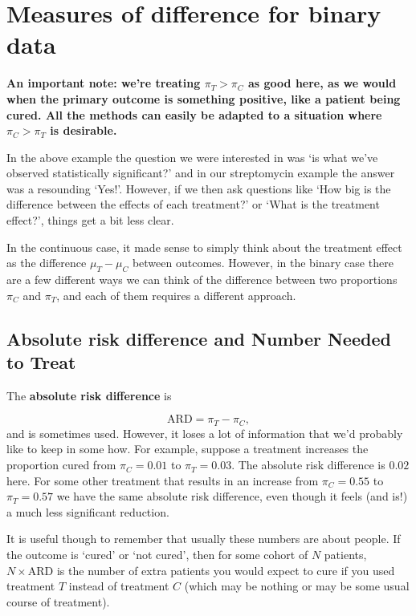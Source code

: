 \documentclass[
  openany]{book}
\theoremstyle{definition}
\theoremstyle{definition}
\theoremstyle{definition}
\theoremstyle{definition}
\theoremstyle{remark}
\begin{document}
\section{Measures of difference for binary data}\label{measures-of-difference-for-binary-data}

\textbf{An important note: we're treating \(\pi_T>\pi_C\) as good here, as we would when the primary outcome is something positive, like a patient being cured. All the methods can easily be adapted to a situation where \(\pi_C>\pi_T\) is desirable.}

In the above example the question we were interested in was `is what we've observed statistically significant?' and in our streptomycin example the answer was a resounding `Yes!'. However, if we then ask questions like `How big is the difference between the effects of each treatment?' or `What is the treatment effect?', things get a bit less clear.

In the continuous case, it made sense to simply think about the treatment effect as the difference \(\mu_T - \mu_C\) between outcomes. However, in the binary case there are a few different ways we can think of the difference between two proportions \(\pi_C\) and \(\pi_T\), and each of them requires a different approach.

\subsection{Absolute risk difference and Number Needed to Treat}\label{ard-and-nnt}

The \textbf{absolute risk difference} is

\[\text{ARD} = \pi_T - \pi_C,\]
and is sometimes used. However, it loses a lot of information that we'd probably like to keep in some how. For example, suppose a treatment increases the proportion cured from \(\pi_C=0.01\) to \(\pi_T=0.03\). The absolute risk difference is \(0.02\) here. For some other treatment that results in an increase from \(\pi_C=0.55\) to \(\pi_T = 0.57\) we have the same absolute risk difference, even though it feels (and is!) a much less significant reduction.

It is useful though to remember that usually these numbers are about people. If the outcome is `cured' or `not cured', then for some cohort of \(N\) patients, \(N\times\text{ARD}\) is the number of extra patients you would expect to cure if you used treatment \(T\) instead of treatment \(C\) (which may be nothing or may be some usual course of treatment).
\end{document}
